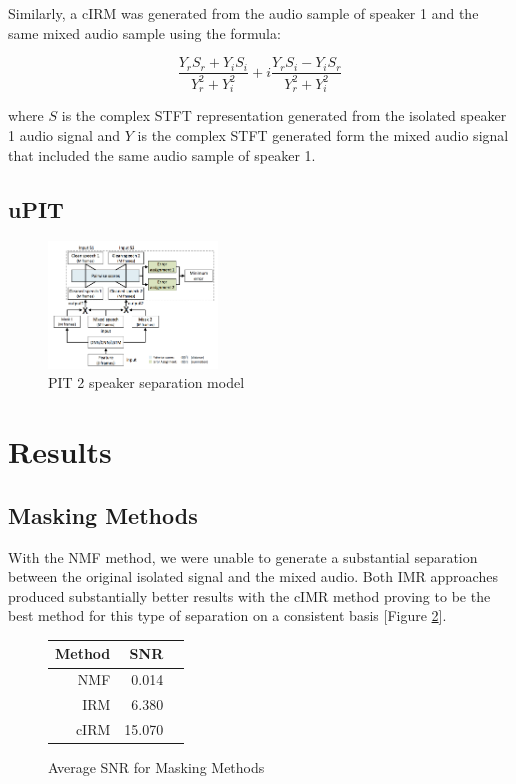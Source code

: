 \documentclass[journal, a4paper]{IEEEtran}
\begin{document}
Similarly, a cIRM was generated from the audio sample of speaker 1 and the same mixed audio sample using the formula:

\[
\dfrac{Y_r S_r + Y_i S_i}{Y_r^2 + Y_i^2} +
i\dfrac{Y_r S_i - Y_i S_r}{Y_r^2 + Y_i^2}
\]

\begin{flushleft}
where $S$ is the complex STFT representation generated from the isolated speaker 1 audio signal and $Y$ is the complex STFT generated form the mixed audio signal that included the same audio sample of speaker 1.\cite{DBLP:journals/corr/abs-1708-07524}
\end{flushleft}

\subsection{uPIT}


\begin{figure}[h!]
    \centering  
     \caption{\label{fig:pit_diagram}PIT 2 speaker separation model}  
    \includegraphics[width=0.4\textwidth]{PIT.png}  
\end{figure}



\section{Results}

\subsection{Masking Methods}

With the NMF method, we were unable to generate a substantial separation between the original isolated signal and the mixed audio. Both IMR approaches produced substantially better results with the cIMR method proving to be the best method for this type of separation on a consistent basis [Figure \ref{Fig:masking_snr}].


\begin{figure}[h!]
    \centering  
     \caption{\label{Fig:masking_snr}Average SNR for Masking Methods}  

  \begin{tabular}{r r r}\\
  
        Method & SNR \\
        \midrule
        NMF & 0.014 \\
        IRM & 6.380 \\
        cIRM & 15.070 \\
        \midrule
    \end{tabular}
    
\end{figure}
\end{document}
